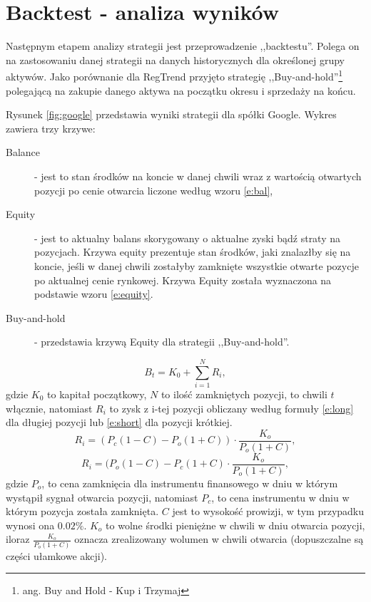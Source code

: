 \documentclass[man,mfu]{mgrwms}
\begin{document}
\section{Backtest - analiza wyników}

Następnym etapem analizy strategii jest przeprowadzenie ,,backtestu''. Polega on na zastosowaniu danej strategii na danych historycznych dla określonej grupy aktywów. Jako porównanie dla RegTrend przyjęto strategię ,,Buy-and-hold''\footnote{ang. Buy and Hold - Kup i Trzymaj} polegającą na zakupie danego aktywa na początku okresu i sprzedaży na końcu. 

Rysunek \ref{fig:google} przedstawia wyniki strategii dla spółki Google. Wykres zawiera trzy krzywe:
\begin{description}
\item [Balance] - jest to stan środków na koncie w danej chwili wraz z wartością otwartych pozycji po cenie otwarcia liczone według wzoru \ref{e:bal},
\item [Equity] - jest to aktualny balans skorygowany o aktualne zyski bądź straty na pozycjach. Krzywa equity prezentuje stan środków, jaki znalazłby się na koncie, jeśli w danej chwili zostałyby zamknięte wszystkie otwarte pozycje po aktualnej cenie rynkowej. Krzywa Equity została wyznaczona na podstawie wzoru \ref{e:equity}.
\item [Buy-and-hold] - przedstawia krzywą Equity dla strategii ,,Buy-and-hold''.
\end{description}
\begin{equation}\label{e:bal}
B_t = K_0 + \sum_{i=1}^NR_i,
\end{equation}
gdzie $K_0$ to kapitał początkowy, $N$ to ilość zamkniętych pozycji, to chwili $t$ włącznie, natomiast $R_i$ to zysk z i-tej pozycji obliczany według formuły \ref{e:long} dla długiej pozycji lub \ref{e:short} dla pozycji krótkiej.
\begin{equation}\label{e:long}
R_i = (P_c(1-C) - P_o(1+C)) \cdot \frac{K_o}{P_o(1+C)},
\end{equation}
\begin{equation}\label{e:short}
R_i = (P_o(1-C) - P_c(1+C) \cdot \frac{K_o}{P_o(1+C)},
\end{equation}
gdzie $P_o$, to cena zamknięcia dla instrumentu finansowego w dniu w którym wystąpił sygnał otwarcia pozycji, natomiast $P_c$, to cena instrumentu w dniu w którym pozycja została zamknięta. $C$ jest to wysokość prowizji, w tym przypadku wynosi ona $0.02\%$. $K_o$ to wolne środki pieniężne w chwili w dniu otwarcia pozycji, iloraz $\frac{K_o}{P_o(1+C)}$ oznacza zrealizowany wolumen w chwili otwarcia (dopuszczalne są części ułamkowe akcji).
\end{document}
